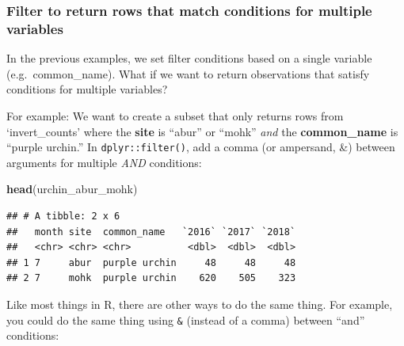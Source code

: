 \documentclass[]{book}
\newenvironment{Shaded}{\begin{snugshade}}{\end{snugshade}}
\newcommand{\CommentTok}[1]{\textcolor[rgb]{0.56,0.35,0.01}{\textit{#1}}}
\newcommand{\KeywordTok}[1]{\textcolor[rgb]{0.13,0.29,0.53}{\textbf{#1}}}
\newcommand{\NormalTok}[1]{#1}
\newcommand{\OperatorTok}[1]{\textcolor[rgb]{0.81,0.36,0.00}{\textbf{#1}}}
\newcommand{\StringTok}[1]{\textcolor[rgb]{0.31,0.60,0.02}{#1}}
\begin{document}
\hypertarget{filter-to-return-rows-that-match-conditions-for-multiple-variables}{%
\subsubsection{Filter to return rows that match conditions for multiple variables}\label{filter-to-return-rows-that-match-conditions-for-multiple-variables}}

In the previous examples, we set filter conditions based on a single variable (e.g.~common\_name). What if we want to return observations that satisfy conditions for multiple variables?

For example: We want to create a subset that only returns rows from `invert\_counts' where the \textbf{site} is ``abur'' or ``mohk'' \emph{and} the \textbf{common\_name} is ``purple urchin.'' In \texttt{dplyr::filter()}, add a comma (or ampersand, \&) between arguments for multiple \emph{AND} conditions:

\begin{Shaded}
\end{Shaded}

\begin{Shaded}
\begin{Highlighting}[]
\KeywordTok{head}\NormalTok{(urchin_abur_mohk)}
\end{Highlighting}
\end{Shaded}

\begin{verbatim}
## # A tibble: 2 x 6
##   month site  common_name   `2016` `2017` `2018`
##   <chr> <chr> <chr>          <dbl>  <dbl>  <dbl>
## 1 7     abur  purple urchin     48     48     48
## 2 7     mohk  purple urchin    620    505    323
\end{verbatim}

Like most things in R, there are other ways to do the same thing. For example, you could do the same thing using \texttt{\&} (instead of a comma) between ``and'' conditions:

\begin{Shaded}
\end{Shaded}
\end{document}
